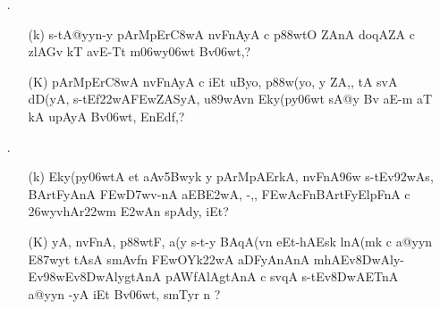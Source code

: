 \begin{itemize}
  \item[{\dn \dnnum \rn{20}}.] \begin{itemize}
             
             \item[({\dn k})] {\dn s\2-tA@yyn-y pArMpEr\3C8wA\2 nvFnAyA\2 c p\388wtO ZAnA\2 doqAZA\2 c zlAGv\2 kT avE-Tt\2 m\306wy\306wt\? Bv\306wt,{\rs ?\re}}
             
             \item[({\dn K})] {\dn pArMpEr\3C8wA\2 nvFnAyA\2 c iEt uByo, p\388w(yo, y\? ZA,{\rs ,\re} tA svA\0 dD(yA, s\2-tEf\322wA\3FEwZASyA, u\389wAvn\2 Eky(py\0\306wt\2 sA@y\2 Bv\? aE-m aT\?{\qvb} kA upAyA Bv\306wt, EnEd\0f\?,{\rs ?\re}}
             \end{itemize} 
             
             
 \item[{\dn \dnnum \rn{21}}.]  \begin{itemize}
                
                \item[({\dn k})] {\dn Eky(py\0\306wtA et aAv\35Bwyk\2 y pArMpAErkA, nvFnA\396w s\2-tEv\392wA\2s, BArtFyAnA\2 \3FEw\3D7wv-nA aEB\3E2wA, -,{\rs ,\re} \3FEwAcFnBArtFyElpFnA\2 c \326wyvhAr\322wm\2 \3E2wAn\2 s\2pAdy\?, iEt{\rs ?\re}}
                
                \item[({\dn K})] {\dn yA, nvFnA, p\388wtF, a(y s\2-t-y BAqA(v\?n e\?Et{\rs -\re}\-hAEsk\2 lnA(mk\2 c a@yyn\2 E\387wyt\?{\rs ,\re} tAsA\2 smAv\?fn\2 \3FEwOYk\322wA aDFyAnAnA\2 mhAEv\38DwAly{\rs -\re}Ev\398wEv\38DwAlygtAnA\2 pAWfAlAgtAnA\2 c sv\?{\qvb}qA\2 s\2-tEv\38DwAET\0nA a@yyn\? -yA iEt Bv\306wt, smT\0y\?r n {\rs ?\re}}
                \end{itemize}
\end{itemize}
            

